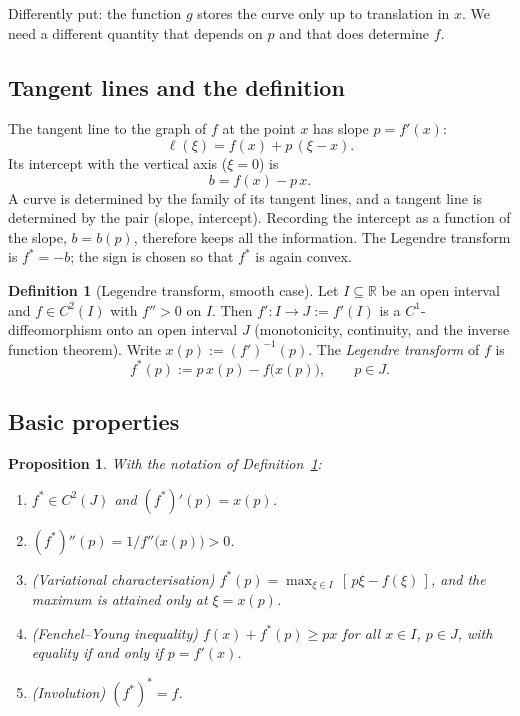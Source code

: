\documentclass[11pt,a4paper]{article}
\newcommand{\R}{\mathbb{R}}
\theoremstyle{plain}
\newtheorem{proposition}[theorem]{Proposition}
\theoremstyle{definition}
\newtheorem{definition}[theorem]{Definition}
\theoremstyle{remark}
\begin{document}
Differently put: the function $g$ stores the curve only up to translation in
$x$.  We need a different quantity that depends on $p$ and that does
determine $f$.

\subsection{Tangent lines and the definition}

The tangent line to the graph of $f$ at the point $x$ has slope $p=f'(x)$:
\[
  \ell(\xi)=f(x)+p\,(\xi-x).
\]
Its intercept with the vertical axis ($\xi=0$) is
\[
  b = f(x)-p\,x .
\]
A curve is determined by the family of its tangent lines, and a tangent line
is determined by the pair (slope, intercept).  Recording the intercept as a
function of the slope, $b=b(p)$, therefore keeps all the information.  The
Legendre transform is $f^*=-b$; the sign is chosen so that $f^*$ is again
convex.

\begin{definition}[Legendre transform, smooth case]\label{def:legendre1d}
Let $I\subseteq\R$ be an open interval and $f\in C^2(I)$ with $f''>0$ on
$I$.  Then $f'\colon I\to J:=f'(I)$ is a $C^1$-diffeomorphism onto an open
interval $J$ (monotonicity, continuity, and the inverse function theorem).
Write $x(p):=(f')^{-1}(p)$. The \emph{Legendre transform} of $f$ is
\[
  f^*(p) := p\,x(p)-f\bigl(x(p)\bigr),\qquad p\in J .
\]
\end{definition}

\subsection{Basic properties}

\begin{proposition}\label{prop:basic1d}
With the notation of Definition~\ref{def:legendre1d}:
\begin{enumerate}[label=(\alph*),nosep]
  \item $f^*\in C^2(J)$ and $(f^*)'(p)=x(p)$.
  \item $(f^*)''(p)=1/f''\bigl(x(p)\bigr)>0$.
  \item (Variational characterisation) $f^*(p)=\max_{\xi\in I}\,[\,p\xi-f(\xi)\,]$,
        and the maximum is attained only at $\xi=x(p)$.
  \item (Fenchel--Young inequality) $f(x)+f^*(p)\ge px$ for all $x\in I$,
        $p\in J$, with equality if and only if $p=f'(x)$.
  \item (Involution) $(f^*)^*=f$.
\end{enumerate}
\end{proposition}
\end{document}
